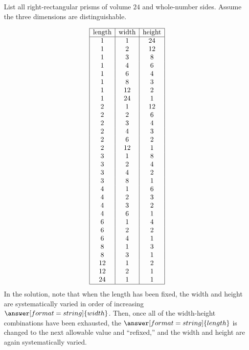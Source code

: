 \documentclass[nooutcomes]{ximera}
\begin{document}
\newpage
\begin{problem}
List all right-rectangular prisms of volume $24$ and whole-number sides.  Assume the three dimensions are distinguishable. 
\begin{solution}
\[
\begin{array}{|c|c|c|}
\hline
\text{length} & \text{width} & \text{height} \\ 
\hline
1 & 1 & 24 \\
1 & 2 & 12 \\
1 & 3 & 8 \\
1 & 4 & 6 \\
1 & 6 & 4 \\
1 & 8 & 3 \\
1 & 12 & 2 \\
1 & 24 & 1 \\
2 & 1 & 12 \\
2 & 2 & 6 \\
2 & 3 & 4 \\
2 & 4 & 3 \\
2 & 6 & 2 \\
2 & 12 & 1 \\
3 & 1 & 8 \\
3 & 2 & 4 \\
3 & 4 & 2 \\
3 & 8 & 1 \\
4 & 1 & 6 \\
4 & 2 & 3 \\
4 & 3 & 2 \\
4 & 6 & 1 \\
6 & 1 & 4 \\
6 & 2 & 2 \\
6 & 4 & 1 \\
8 & 1 & 3 \\
8 & 3 & 1 \\
12 & 1 & 2 \\
12 & 2 & 1 \\
24 & 1 & 1 \\
\hline
\end{array}
\]
In the solution, note that when the length has been fixed, the width and height are systematically varied in order of increasing $\answer[format=string]{width}$. Then, once all of the width-height combinations have been exhausted, the 
$\answer[format=string]{length}$ is changed to the next allowable value and ``refixed,'' and the width and height are again systematically varied.  
\end{solution}
\end{problem}
\end{document}
